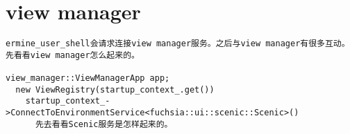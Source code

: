 \section{view manager}

\begin{verbatim}
ermine_user_shell会请求连接view manager服务。之后与view manager有很多互动。
先看看view manager怎么起来的。

view_manager::ViewManagerApp app;
  new ViewRegistry(startup_context_.get())
    startup_context_->ConnectToEnvironmentService<fuchsia::ui::scenic::Scenic>()
      先去看看Scenic服务是怎样起来的。
\end{verbatim}
